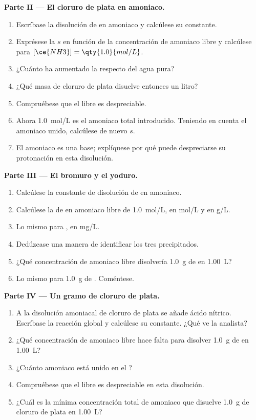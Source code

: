 \begin{problem}
\medskip
\noindent\textbf{Parte II --- El cloruro de plata en amoniaco.}
\begin{enumerate}[resume]
  \item Escríbase la disolución de  en amoniaco y calcúlese su
        constante.
  \item Exprésese la  $s$ en función de la concentración de
        amoniaco libre y calcúlese para $[\ce{NH3}] = \qty{1.0}{mol/L}$.
  \item ¿Cuánto ha aumentado la  respecto del agua pura?
  \item ¿Qué masa de cloruro de plata disuelve entonces un litro?
  \item Compruébese que el  libre es despreciable.
  \item Ahora \qty{1.0}{mol/L} es el amoniaco total introducido. Teniendo
        en cuenta el amoniaco unido, calcúlese de nuevo $s$.
  \item El amoniaco es una base; explíquese por qué puede despreciarse su
        protonación en esta disolución.
\end{enumerate}

\medskip
\noindent\textbf{Parte III --- El bromuro y el yoduro.}
\begin{enumerate}[resume]
  \item Calcúlese la constante de disolución de  en amoniaco.
  \item Calcúlese la  de  en amoniaco libre de
        \qty{1.0}{mol/L}, en \unit{mol/L} y en \unit{g/L}.
  \item Lo mismo para , en \unit{mg/L}.
  \item Dedúzcase una manera de identificar los tres precipitados.
  \item ¿Qué concentración de amoniaco libre disolvería \qty{1.0}{g} de
         en \qty{1.00}{L}?
  \item Lo mismo para \qty{1.0}{g} de . Coméntese.
\end{enumerate}

\medskip
\noindent\textbf{Parte IV --- Un gramo de cloruro de plata.}
\begin{enumerate}[resume]
  \item A la disolución amoniacal de cloruro de plata se añade ácido
        nítrico. Escríbase la reacción global y calcúlese su constante.
        ¿Qué ve la analista?
  \item ¿Qué concentración de amoniaco libre hace falta para disolver
        \qty{1.0}{g} de  en \qty{1.00}{L}?
  \item ¿Cuánto amoniaco está unido en el ?
  \item Compruébese que el  libre es despreciable en esta
        disolución.
  \item ¿Cuál es la mínima concentración total de amoniaco que disuelve
        \qty{1.0}{g} de cloruro de plata en \qty{1.00}{L}?
\end{enumerate}
\end{problem}
